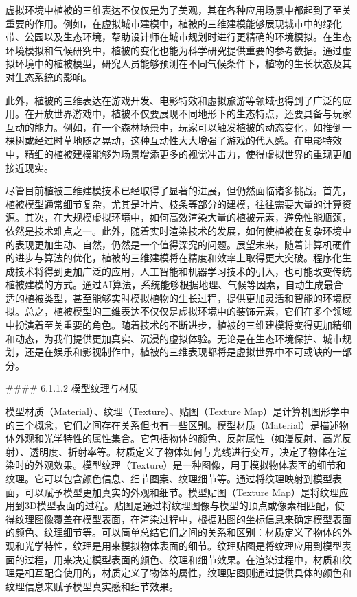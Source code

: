 虚拟环境中植被的三维表达不仅仅是为了美观，其在各种应用场景中都起到了至关重要的作用。例如，在虚拟城市建模中，植被的三维建模能够展现城市中的绿化带、公园以及生态环境，帮助设计师在城市规划时进行更精确的环境模拟。在生态环境模拟和气候研究中，植被的变化也能为科学研究提供重要的参考数据。通过虚拟环境中的植被模型，研究人员能够预测在不同气候条件下，植物的生长状态及其对生态系统的影响。

此外，植被的三维表达在游戏开发、电影特效和虚拟旅游等领域也得到了广泛的应用。在开放世界游戏中，植被不仅要展现不同地形下的生态特点，还要具备与玩家互动的能力。例如，在一个森林场景中，玩家可以触发植被的动态变化，如推倒一棵树或经过时草地随之晃动，这种互动性大大增强了游戏的代入感。在电影特效中，精细的植被建模能够为场景增添更多的视觉冲击力，使得虚拟世界的重现更加接近现实。

尽管目前植被三维建模技术已经取得了显著的进展，但仍然面临诸多挑战。首先，植被模型通常细节复杂，尤其是叶片、枝条等部分的建模，往往需要大量的计算资源。其次，在大规模虚拟环境中，如何高效渲染大量的植被元素，避免性能瓶颈，依然是技术难点之一。此外，随着实时渲染技术的发展，如何使植被在复杂环境中的表现更加生动、自然，仍然是一个值得深究的问题。展望未来，随着计算机硬件的进步与算法的优化，植被的三维建模将在精度和效率上取得更大突破。程序化生成技术将得到更加广泛的应用，人工智能和机器学习技术的引入，也可能改变传统植被建模的方式。通过AI算法，系统能够根据地理、气候等因素，自动生成最合适的植被类型，甚至能够实时模拟植物的生长过程，提供更加灵活和智能的环境模拟。总之，植被模型的三维表达不仅仅是虚拟环境中的装饰元素，它们在多个领域中扮演着至关重要的角色。随着技术的不断进步，植被的三维建模将变得更加精细和动态，为我们提供更加真实、沉浸的虚拟体验。无论是在生态环境保护、城市规划，还是在娱乐和影视制作中，植被的三维表现都将是虚拟世界中不可或缺的一部分。

\#\#\#\# 6.1.1.2 模型纹理与材质

模型材质（Material）、纹理（Texture）、贴图（Texture Map）是计算机图形学中的三个概念，它们之间存在关系但也有一些区别。模型材质（Material）是描述物体外观和光学特性的属性集合。它包括物体的颜色、反射属性（如漫反射、高光反射）、透明度、折射率等。材质定义了物体如何与光线进行交互，决定了物体在渲染时的外观效果。模型纹理（Texture）是一种图像，用于模拟物体表面的细节和纹理。它可以包含颜色信息、细节图案、纹理细节等。通过将纹理映射到模型表面，可以赋予模型更加真实的外观和细节。模型贴图（Texture Map）是将纹理应用到3D模型表面的过程。贴图是通过将纹理图像与模型的顶点或像素相匹配，使得纹理图像覆盖在模型表面，在渲染过程中，根据贴图的坐标信息来确定模型表面的颜色、纹理细节等。可以简单总结它们之间的关系和区别：材质定义了物体的外观和光学特性，纹理是用来模拟物体表面的细节。纹理贴图是将纹理应用到模型表面的过程，用来决定模型表面的颜色、纹理和细节效果。在渲染过程中，材质和纹理是相互配合使用的，材质定义了物体的属性，纹理贴图则通过提供具体的颜色和纹理信息来赋予模型真实感和细节效果。

